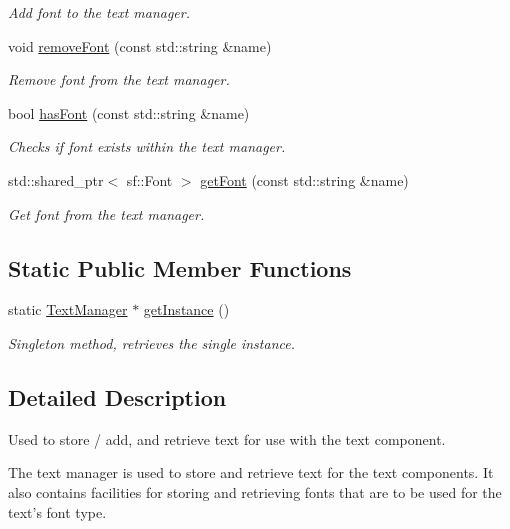 \begin{DoxyCompactItemize}
\begin{DoxyCompactList}\small\item\em Add font to the text manager. \end{DoxyCompactList}\item 
void \hyperlink{class_text_manager_a2fbf85e7eb461535e44102d3c7652736}{remove\-Font} (const std\-::string \&name)
\begin{DoxyCompactList}\small\item\em Remove font from the text manager. \end{DoxyCompactList}\item 
bool \hyperlink{class_text_manager_a1eefe30411316adbab9a30e1aeec4205}{has\-Font} (const std\-::string \&name)
\begin{DoxyCompactList}\small\item\em Checks if font exists within the text manager. \end{DoxyCompactList}\item 
std\-::shared\-\_\-ptr$<$ sf\-::\-Font $>$ \hyperlink{class_text_manager_a35a531d1cd399e9f2e8456242cc9dc25}{get\-Font} (const std\-::string \&name)
\begin{DoxyCompactList}\small\item\em Get font from the text manager. \end{DoxyCompactList}\end{DoxyCompactItemize}
\subsection*{Static Public Member Functions}
\begin{DoxyCompactItemize}
\item 
static \hyperlink{class_text_manager}{Text\-Manager} $\ast$ \hyperlink{class_text_manager_abf9e79079b6ccf917b3cd3a100c7e7bb}{get\-Instance} ()
\begin{DoxyCompactList}\small\item\em Singleton method, retrieves the single instance. \end{DoxyCompactList}\end{DoxyCompactItemize}


\subsection{Detailed Description}
Used to store / add, and retrieve text for use with the text component. 

The text manager is used to store and retrieve text for the text components. It also contains facilities for storing and retrieving fonts that are to be used for the text's font type. 

